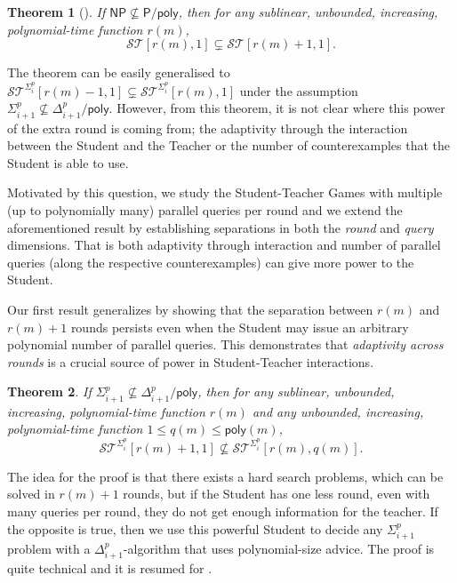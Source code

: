 \documentclass[11pt]{article}
\newcommand{\poly}{\mathsf{poly}}
\renewcommand{\P}{\mathsf{P}}
\newcommand{\NP}{\mathsf{NP}}
\newtheorem{theorem}{Theorem}[section]
\theoremstyle{definition}
\theoremstyle{definition}
\theoremstyle{remark}
\begin{document}
\begin{theorem}[\cite{KrajicekPS90}]\label{thm:sgall}
If $\NP \not\subseteq \P/\mathsf{poly}$, then for any sublinear, unbounded, increasing, polynomial-time function $r(m)$,
\[
\mathcal{ST}[r(m),1] \subsetneq \mathcal{ST}[r(m)+1,1].
\]
\end{theorem}

The theorem can be easily generalised to $\mathcal{ST}^{\Sigma^p_i}[r(m)-1,1] \subsetneq \mathcal{ST}^{\Sigma^p_i}[r(m),1]$ under the assumption $\Sigma^p_{i+1}\not\subseteq\Delta^p_{i+1}/\poly$. However, from this theorem, it is not clear where this power of the extra round is coming from; the adaptivity through the interaction between the Student and the Teacher or the number of counterexamples that the Student is able to use.

Motivated by this question, we study the Student-Teacher Games with multiple (up to polynomially many) parallel queries per round and we extend the aforementioned result by establishing separations in both the \emph{round} and \emph{query} dimensions. That is both adaptivity through interaction and number of parallel queries (along the respective counterexamples) can give more power to the Student.

Our first result generalizes  by showing that the separation between $r(m)$ and $r(m)+1$ rounds persists even when the Student may issue an arbitrary polynomial number of parallel queries. 
This demonstrates that \emph{adaptivity across rounds} is a crucial source of power in Student-Teacher interactions.

\begin{theorem}\label{thm:st1}
If $\Sigma^p_{i+1}\not\subseteq\Delta^p_{i+1}/\poly$, then for any sublinear, unbounded, increasing, polynomial-time function $r(m)$ and any unbounded, increasing, polynomial-time function $1\leq q(m) \leq \mathsf{poly}(m)$,
\[
\mathcal{ST}^{\Sigma^p_i}[r(m)+1,1] \not\subseteq\mathcal{ST}^{\Sigma^p_i}[r(m),q(m)].
\]
\end{theorem}

The idea for the proof is that there exists a hard search problems, which can be solved in $r(m)+1$ rounds, but if the Student has one less round, even with many queries per round, they do not get enough information for the teacher. If the opposite is true, then we use this powerful Student to decide any $\Sigma^p_{i+1}$ problem with a $\Delta^p_{i+1}$-algorithm that uses polynomial-size advice. The proof is quite technical and it is resumed for .
\end{document}

